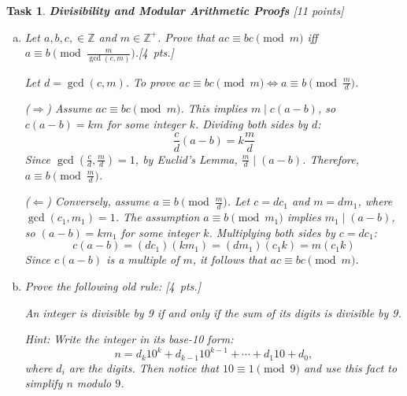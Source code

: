 \documentclass[11pt,twoside,a4paper]{article}
\theoremstyle{exercise}
\newtheorem{exercise}{Task}
\begin{document}


\begin{exercise}\textbf{Divisibility and Modular Arithmetic Proofs} [11 points]


\begin{enumerate}[(a)]


\item Let $a,b,c,\in\mathbb{Z}$ and $m\in\mathbb{Z}^+$. Prove that $ac\equiv bc \pmod{m}$ iff $a \equiv b \pmod{\frac{m}{\gcd(c,m)}}$.\hfill [4~pts.]
\vspace{0.3cm}

Let $d = \gcd(c, m)$. To prove $ac \equiv bc \pmod m \iff a \equiv b \pmod{\frac{m}{d}}$.

($\Rightarrow$) Assume $ac \equiv bc \pmod m$. This implies $m \mid c(a-b)$, so $c(a-b) = km$ for some integer $k$. Dividing both sides by $d$:
\[ \frac{c}{d}(a-b) = k\frac{m}{d} \]
Since $\gcd(\frac{c}{d}, \frac{m}{d}) = 1$, by Euclid's Lemma, $\frac{m}{d} \mid (a-b)$. 
Therefore, $a \equiv b \pmod{\frac{m}{d}}$.

($\Leftarrow$) Conversely, assume $a \equiv b \pmod{\frac{m}{d}}$. 
Let $c = dc_1$ and $m = dm_1$, where $\gcd(c_1, m_1) = 1$. 
The assumption $a \equiv b \pmod{m_1}$ implies $m_1 \mid (a-b)$, so $(a-b) = km_1$ for some integer $k$. 
Multiplying both sides by $c = dc_1$:
\[ c(a-b) = (dc_1)(km_1) = (dm_1)(c_1k) = m(c_1k) \]
Since $c(a-b)$ is a multiple of $m$, it follows that $ac \equiv bc \pmod m$.
\vspace{0.3cm}
\item Prove the following old rule: \hfill [4~pts.]
\begin{center}
\emph{An integer is divisible by 9 if and only if the sum of its digits is divisible by 9.} 
\end{center}
%

\textit{Hint:} Write the integer in its base-10 form:
\[
n = d_k10^k + d_{k-1}10^{k-1} + \cdots + d_1 10 + d_0,
\]
where $d_i$ are the digits. Then notice that $10 \equiv 1 \pmod{9}$ and use this fact to simplify $n$ modulo $9$.


\end{enumerate}
\end{exercise}
\end{document}
